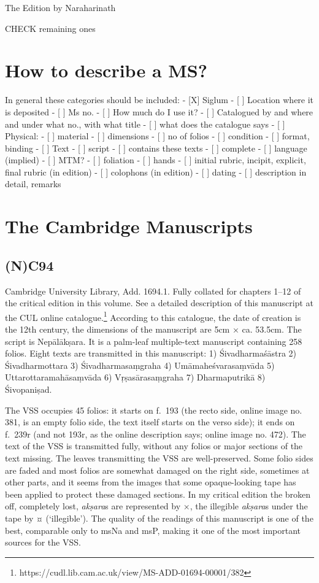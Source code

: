 \documentclass[12pt]{book}
\begin{document}
{The Edition by Naraharinath}

{CHECK remaining ones}

{%
\section{How to describe a MS?}\label{how-to-describe-a-ms}}

In general these categories should be included: - {[}X{]} Siglum - {[}
{]} Location where it is deposited - {[} {]} Ms no. - {[} {]} How much
do I use it? - {[} {]} Catalogued by and where and under what no., with
what title - {[} {]} what does the catalogue says - {[} {]} Physical: -
{[} {]} material - {[} {]} dimensions - {[} {]} no of folios - {[} {]}
condition - {[} {]} format, binding - {[} {]} Text - {[} {]} script -
{[} {]} contains these texts - {[} {]} complete - {[} {]} language
(implied) - {[} {]} MTM? - {[} {]} foliation - {[} {]} hands - {[} {]}
initial rubric, incipit, explicit, final rubric (in edition) - {[} {]}
colophons (in edition) - {[} {]} dating - {[} {]} description in detail,
remarks

{%
\section{The Cambridge Manuscripts}\label{the-cambridge-manuscripts}}

{%
\subsection{(N)C94}\label{nc94}}

Cambridge University Library, Add. 1694.1. Fully collated for chapters
1--12 of the critical edition in this volume. See a detailed description
of this manuscript at the CUL online catalogue.\footnote{https://cudl.lib.cam.ac.uk/view/MS-ADD-01694-00001/382}
According to this catalogue, the date of creation is the 12th century,
the dimensions of the manuscript are 5cm × ca. 53.5cm. The script is
Nepālākṣara. It is a palm-leaf multiple-text manuscript containing 258
folios. Eight texts are transmitted in this manuscript: 1)
Śivadharmaśāstra 2) Śivadharmottara 3) Śivadharmasaṃgraha 4)
Umāmaheśvarasaṃvāda 5) Uttarottaramahāsaṃvāda 6) Vṛṣasārasaṃgraha 7)
Dharmaputrikā 8) Śivopaniṣad.

The VSS occupies 45 folios: it starts on f.~193 (the recto side, online
image no. 381, is an empty folio side, the text itself starts on the
verso side); it ends on f.~239r (and not 193r, as the online description
says; online image no. 472). The text of the VSS is transmitted fully,
without any folios or major sections of the text missing. The leaves
transmitting the VSS are well-preserved. Some folio sides are faded and
most folios are somewhat damaged on the right side, sometimes at other
parts, and it seems from the images that some opaque-looking tape has
been applied to protect these damaged sections. In my critical edition
the broken off, completely lost, \emph{akṣara}s are represented by ×,
the illegible \emph{akṣara}s under the tape by ¤ (`illegible'). The
quality of the readings of this manuscript is one of the best,
comparable only to msNa and msP, making it one of the most important
sources for the VSS.
\end{document}
